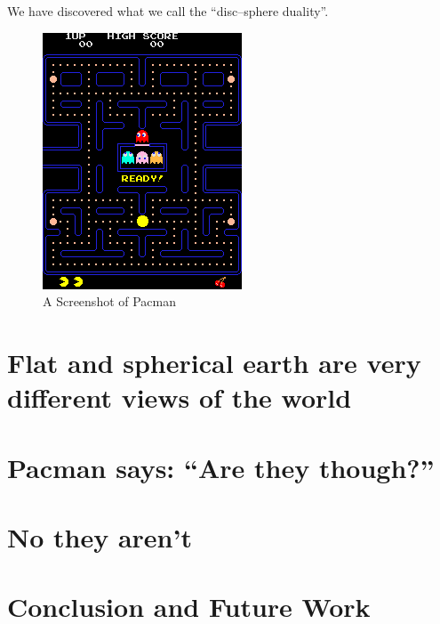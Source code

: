 \documentclass{article}
\begin{document}
We have discovered what we call the ``disc–sphere duality''.

\begin{figure}[ht]
  \centering
  \includegraphics{images/pacman.png}
  \caption{A Screenshot of Pacman}
  \label{fig:pacman-screenshot}
\end{figure}

\section{Flat and spherical earth are very different views of the world}
\section{Pacman says: ``Are they though?''}
\section{No they aren't}
\section{Conclusion and Future Work}
\end{document}
